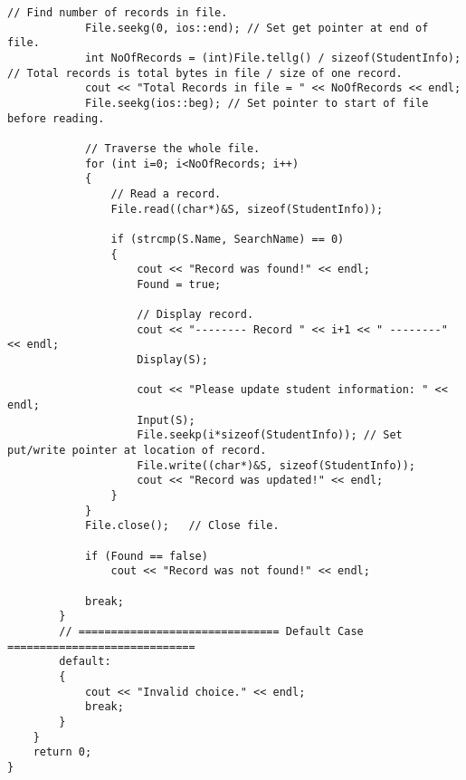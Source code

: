 \documentclass[12pt,a4paper]{article}
\begin{document}
\begin{lstlisting}[caption={Random access in binary file}]
			// Find number of records in file.
			File.seekg(0, ios::end); // Set get pointer at end of file.
			int NoOfRecords = (int)File.tellg() / sizeof(StudentInfo); // Total records is total bytes in file / size of one record.
			cout << "Total Records in file = " << NoOfRecords << endl;
			File.seekg(ios::beg); // Set pointer to start of file before reading.

			// Traverse the whole file.
			for (int i=0; i<NoOfRecords; i++)
			{
				// Read a record.
				File.read((char*)&S, sizeof(StudentInfo));

				if (strcmp(S.Name, SearchName) == 0)
				{
					cout << "Record was found!" << endl;
					Found = true;

					// Display record.
					cout << "-------- Record " << i+1 << " --------" << endl;
					Display(S);

					cout << "Please update student information: " << endl;
					Input(S);
					File.seekp(i*sizeof(StudentInfo)); // Set put/write pointer at location of record.
					File.write((char*)&S, sizeof(StudentInfo));
					cout << "Record was updated!" << endl;
				}
			}
			File.close();	// Close file.

			if (Found == false)
				cout << "Record was not found!" << endl;

			break;
		}
		// =============================== Default Case =============================
		default:
		{
			cout << "Invalid choice." << endl;
			break;
		}
	}
	return 0;
}
\end{lstlisting}


\end{document}
